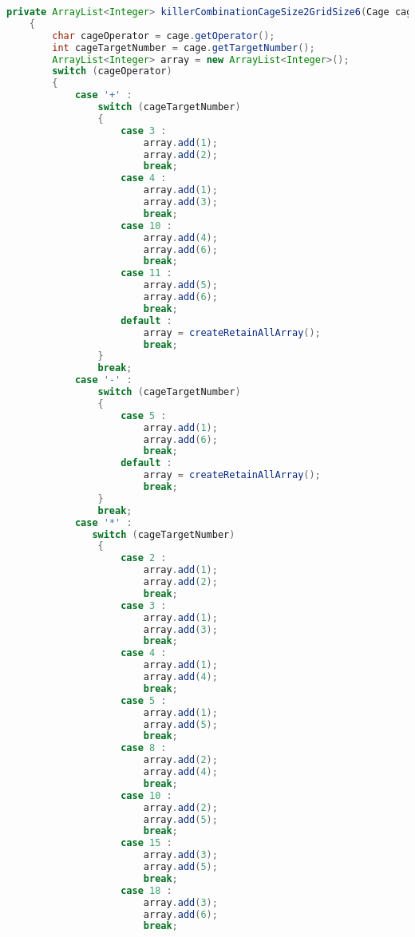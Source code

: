 \begin{lstlisting}[language=Java,basicstyle=\tiny,caption=SolverRuleBased.java]
    private ArrayList<Integer> killerCombinationCageSize2GridSize6(Cage cage)
    {
        char cageOperator = cage.getOperator();
        int cageTargetNumber = cage.getTargetNumber();
        ArrayList<Integer> array = new ArrayList<Integer>();
        switch (cageOperator)
        {
            case '+' :
                switch (cageTargetNumber)
                {
                    case 3 :
                        array.add(1);
                        array.add(2);
                        break;
                    case 4 :  
                        array.add(1);
                        array.add(3);
                        break;
                    case 10 :
                        array.add(4);
                        array.add(6);
                        break;
                    case 11 :
                        array.add(5);
                        array.add(6);
                        break;
                    default :
                        array = createRetainAllArray();
                        break;
                }
                break;
            case '-' :
                switch (cageTargetNumber)
                {
                    case 5 :
                        array.add(1);
                        array.add(6);
                        break;
                    default :
                        array = createRetainAllArray();
                        break;
                }
                break;
            case '*' :
               switch (cageTargetNumber)
                {
                    case 2 :
                        array.add(1);
                        array.add(2);
                        break;
                    case 3 :
                        array.add(1);
                        array.add(3);
                        break;
                    case 4 :
                        array.add(1);
                        array.add(4);
                        break;
                    case 5 :
                        array.add(1);
                        array.add(5);
                        break;
                    case 8 :
                        array.add(2);
                        array.add(4);
                        break;
                    case 10 :
                        array.add(2);
                        array.add(5);
                        break;
                    case 15 :
                        array.add(3);
                        array.add(5);
                        break;
                    case 18 :
                        array.add(3);
                        array.add(6);
                        break;

\end{lstlisting}
